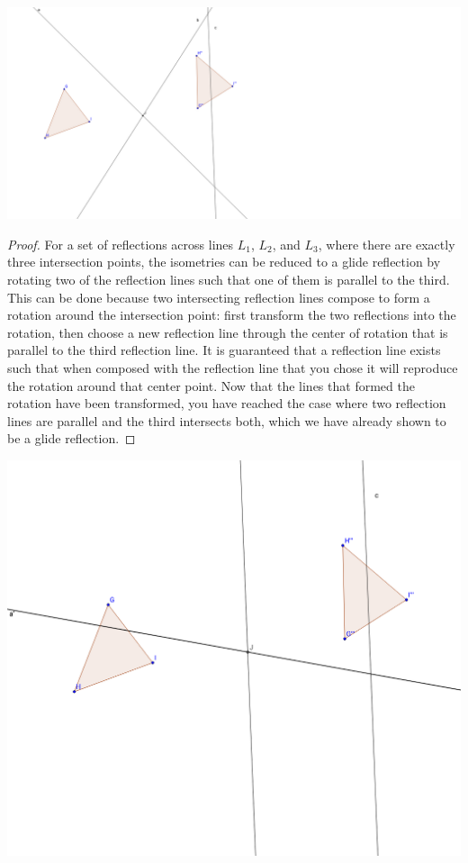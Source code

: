 \documentclass[11pt]{article}
\theoremstyle{definition}
\begin{document}
\includegraphics[scale=.4]{intersect3}
\begin{proof}
  For a set of reflections across lines $L_{1}$, $L_{2}$, and $L_{3}$, where
  there are exactly three intersection points, the isometries can be reduced to
  a glide reflection by rotating two of the reflection lines such that one of
  them is parallel to the third. This can be done because two intersecting
  reflection lines compose to form a rotation around the intersection point:
  first transform the two reflections into the rotation, then choose a new
  reflection line through the center of rotation that is parallel to the third
  reflection line. It is guaranteed that a reflection line exists such that
  when composed with the reflection line that you chose it will reproduce the
  rotation around that center point. Now that the lines that formed the
  rotation have been transformed, you have reached the case where two
  reflection lines are parallel and the third intersects both, which we have
  already shown to be a glide reflection.

\end{proof}
\includegraphics[scale=.4]{intersect21}
\end{document}
